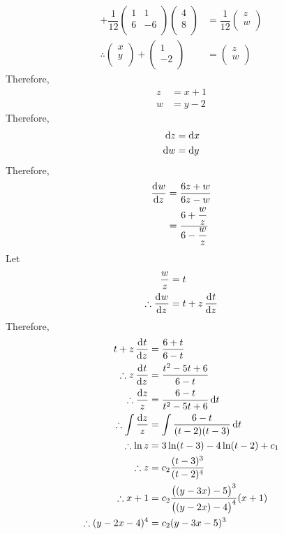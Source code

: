 \documentclass[fleqn, a4paper, 12pt, oneside]{amsart}
\theoremstyle{definition}
\theoremstyle{theorem}
\begin{document}
\begin{solution}
\begin{align*}
		+
			\dfrac{1}{12}
			\begin{pmatrix}
				1 & 1\\
				6 & -6\\
			\end{pmatrix}
			\begin{pmatrix}
				4\\
				8\\
			\end{pmatrix}
		&=
			\dfrac{1}{12}
			\begin{pmatrix}
				z\\
				w\\
			\end{pmatrix}\\
		\therefore
			\begin{pmatrix}
				x\\
				y\\
			\end{pmatrix}
		+
			\begin{pmatrix}
				1\\
				-2\\
			\end{pmatrix}
		&=
			\begin{pmatrix}
				z\\
				w\\
			\end{pmatrix}
	\end{align*}
	Therefore,
	\begin{align*}
		z &= x + 1\\
		w &= y - 2
	\end{align*}
	Therefore,
	\begin{align*}
		\dif z &= \dif x\\
		\dif w &= \dif y
	\end{align*}
	Therefore,
	\begin{align*}
		\dod{w}{z} &= \dfrac{6z + w}{6z - w}\\
		&= \dfrac{6 + \dfrac{w}{z}}{6 - \dfrac{w}{z}}
	\end{align*}
	Let
	\begin{align*}
		\dfrac{w}{z} &= t\\
		\therefore \dod{w}{z} &= t + z \dod{t}{z}
	\end{align*}
	Therefore,
	\begin{align*}
		t + z \dod{t}{z} &= \dfrac{6 + t}{6 - t}\\
		\therefore z \dod{t}{z} &= \dfrac{t^2 - 5t + 6}{6 - t}\\
		\therefore \dfrac{\dif z}{z} &= \dfrac{6 - t}{t^2 - 5t + 6} \dif t\\
		\therefore \int \dfrac{\dif z}{z} &= \int \dfrac{6 - t}{(t - 2)(t - 3)} \dif t\\
		\therefore \ln z &= 3 \ln (t - 3) - 4 \ln (t - 2) + c_1\\
		\therefore z &= c_2 \dfrac{(t - 3)^3}{(t - 2)^4}\\
		\therefore x + 1 &= c_2 \dfrac{\left( (y - 3x) - 5 \right)^3}{\left( (y - 2x) - 4 \right)^4} (x + 1)\\
		\therefore (y - 2x - 4)^4 &= c_2 (y - 3x - 5)^3
	\end{align*}
\end{solution}
\end{document}
